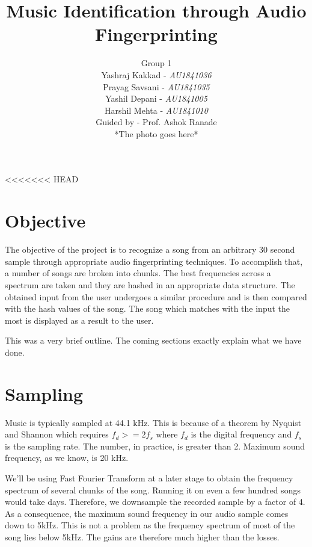 \documentclass[12pt, a4paper]{IEEEtran}
\begin{document}
\title{Music Identification through Audio Fingerprinting}

\author{
    \vspace{10mm}
    \huge
    Group 1 \\
    \vspace{3mm}
    \LARGE
    Yashraj Kakkad - \textit{AU1841036} \\ 
    Prayag Savsani - \textit{AU1841035} \\
    Yashil Depani - \textit{AU1841005} \\ 
    Harshil Mehta - \textit{AU1841010} \\
\vspace{3mm}
Guided by - Prof. Ashok Ranade \\
\null \vfill
*The photo goes here*
}



<<<<<<< HEAD
\section{Objective}
The objective of the project is to recognize a song from an arbitrary 30 second sample through appropriate audio fingerprinting techniques.
To accomplish that, a number of songs are broken into chunks. The best frequencies across a spectrum are taken and they are hashed in an appropriate data structure.
The obtained input from the user undergoes a similar procedure and is then compared with the hash values of the song. The song which matches with the input the most is displayed as a result to the user.
\par
This was a very brief outline. The coming sections exactly explain what we have done.

\section{Sampling}
Music is typically sampled at 44.1 kHz. This is because of a theorem by Nyquist and Shannon which requires \(f_d >= 2f_s\) where \(f_d\) is the digital frequency and \(f_s\) is the sampling rate. The number, in practice, is greater than 2. Maximum sound frequency, as we know, is 20 kHz.
\par
We'll be using Fast Fourier Transform at a later stage to obtain the frequency spectrum of several chunks of the song. Running it on even a few hundred songs would take days.
Therefore, we downsample the recorded sample by a factor of 4. 
As a consequence, the maximum sound frequency in our audio sample comes down to 5kHz. This is not a problem as the frequency spectrum of most of the song lies below 5kHz. The gains are therefore much higher than the losses.
\end{document}
